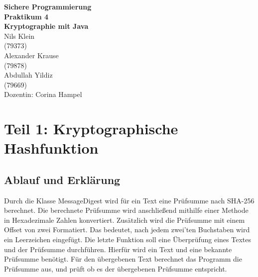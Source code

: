 \documentclass[12pt]{article}
\begin{document}
\begin{center}
  \textbf{\LARGE Sichere Programmierung} \\[1ex]%
  \textbf{\Large Praktikum 4}\\[1ex] %
  \textbf{\Large Kryptographie mit Java}\\[3ex] %
  Nils Klein \\ %
  (79373) \\[1ex] %
  Alexander Krause \\ %
  (79878) \\[1ex] %
  Abdullah Yildiz \\ %
  (79669) \\[1ex] %
  Dozentin: Corina Hampel \\%
  
\end{center}


\newpage
\setcounter{page}{2}
\tableofcontents
\newpage

\section{Teil 1: Kryptographische Hashfunktion}
\subsection{Ablauf und Erklärung}
Durch die Klasse MessageDigest wird für ein Text eine Prüfsumme nach SHA-256 berechnet. Die berechnete Prüfsumme wird anschließend mithilfe einer Methode in Hexadezimale Zahlen konvertiert. Zusätzlich wird die Prüfsumme mit einem Offset von zwei Formatiert. Das bedeutet, nach jedem zwei'ten Buchstaben wird ein Leerzeichen eingefügt. Die letzte Funktion soll eine Überprüfung eines Textes und der Prüfsumme durchführen. Hierfür wird ein Text und eine bekannte Prüfsumme benötigt. Für den übergebenen Text berechnet das Programm die Prüfsumme aus, und prüft ob es der übergebenen Prüfsumme entspricht.
\end{document}
